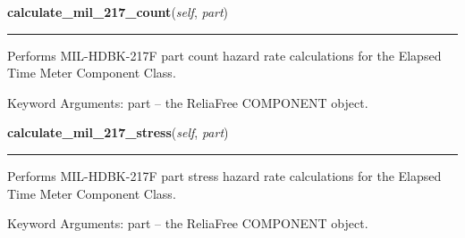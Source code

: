     \label{reliafree:meters:meter:ElapsedTime:calculate_mil_217_count}

    \vspace{0.5ex}

\hspace{.8\funcindent}\begin{boxedminipage}{\funcwidth}

    \raggedright \textbf{calculate\_mil\_217\_count}(\textit{self}, \textit{part})

    \vspace{-1.5ex}

    \rule{\textwidth}{0.5\fboxrule}
\setlength{\parskip}{2ex}
    Performs MIL-HDBK-217F part count hazard rate calculations for the 
    Elapsed Time Meter Component Class.

    Keyword Arguments: part -- the ReliaFree COMPONENT object.

\setlength{\parskip}{1ex}
    \end{boxedminipage}

    \label{reliafree:meters:meter:ElapsedTime:calculate_mil_217_stress}

    \vspace{0.5ex}

\hspace{.8\funcindent}\begin{boxedminipage}{\funcwidth}

    \raggedright \textbf{calculate\_mil\_217\_stress}(\textit{self}, \textit{part})

    \vspace{-1.5ex}

    \rule{\textwidth}{0.5\fboxrule}
\setlength{\parskip}{2ex}
    Performs MIL-HDBK-217F part stress hazard rate calculations for the 
    Elapsed Time Meter Component Class.

    Keyword Arguments: part -- the ReliaFree COMPONENT object.

\setlength{\parskip}{1ex}
    \end{boxedminipage}

